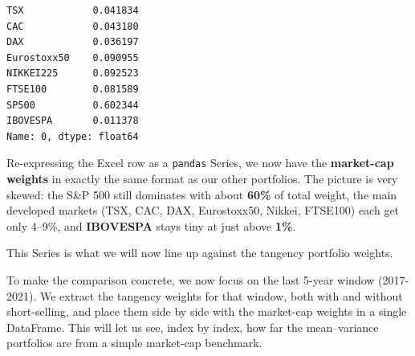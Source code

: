 \documentclass[11pt]{article}
\begin{document}
            \begin{tcolorbox}[breakable, size=fbox, boxrule=.5pt, pad at break*=1mm, opacityfill=0]
\begin{Verbatim}[commandchars=\\\{\}]
TSX            0.041834
CAC            0.043180
DAX            0.036197
Eurostoxx50    0.090955
NIKKEI225      0.092523
FTSE100        0.081589
SP500          0.602344
IBOVESPA       0.011378
Name: 0, dtype: float64
\end{Verbatim}
\end{tcolorbox}
        
    Re-expressing the Excel row as a \texttt{pandas} Series, we now have the
\textbf{market-cap weights} in exactly the same format as our other
portfolios. The picture is very skewed: the S\&P 500 still dominates
with about \textbf{60\%} of total weight, the main developed markets
(TSX, CAC, DAX, Eurostoxx50, Nikkei, FTSE100) each get only 4--9\%, and
\textbf{IBOVESPA} stays tiny at just above \textbf{1\%}.

This Series is what we will now line up against the tangency portfolio
weights.

    To make the comparison concrete, we now focus on the last 5-year window
(2017-2021). We extract the tangency weights for that window, both with
and without short-selling, and place them side by side with the
market-cap weights in a single DataFrame. This will let us see, index by
index, how far the mean--variance portfolios are from a simple
market-cap benchmark.
\end{document}
